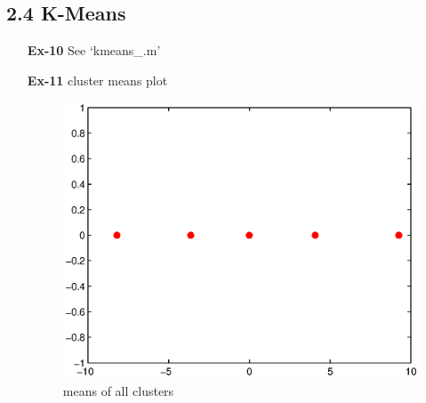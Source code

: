 \documentclass[a4paper]{article}
\begin{document}
\subsection*{2.4 K-Means}
\begin{enumerate}	
	\item[ \textbf{Ex-10} ] See `kmeans\_.m'
	\item[ \textbf{Ex-11} ] cluster means plot
	
	\begin{figure}[H]
		\begin{center}
			\includegraphics[width=1.1\textwidth]{clusters_means.eps}
			\caption{means of all clusters}\label{fig:clustermean}
		\end{center}
	\end{figure}
	
\end{enumerate}
\end{document}
